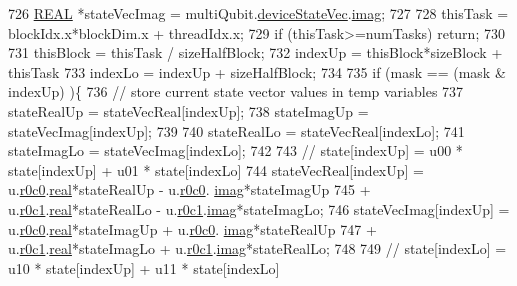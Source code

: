\begin{DoxyCode}
726     \mbox{\hyperlink{QuEST__precision_8h_a4b654506f18b8bfd61ad2a29a7e38c25}{REAL}} *stateVecImag = multiQubit.\mbox{\hyperlink{structMultiQubit_a59ac613486a41b8c9a4b6e79cc8d2cc3}{deviceStateVec}}.\mbox{\hyperlink{structComplexArray_a79dde47c7ae530c79cebfdf57b225968}{imag}};
727 
728     thisTask = blockIdx.x*blockDim.x + threadIdx.x;
729     \textcolor{keywordflow}{if} (thisTask>=numTasks) \textcolor{keywordflow}{return};
730 
731     thisBlock   = thisTask / sizeHalfBlock;
732     indexUp     = thisBlock*sizeBlock + thisTask%
733     indexLo     = indexUp + sizeHalfBlock;
734 
735     \textcolor{keywordflow}{if} (mask == (mask & indexUp) )\{
736         \textcolor{comment}{// store current state vector values in temp variables}
737         stateRealUp = stateVecReal[indexUp];
738         stateImagUp = stateVecImag[indexUp];
739 
740         stateRealLo = stateVecReal[indexLo];
741         stateImagLo = stateVecImag[indexLo];
742 
743         \textcolor{comment}{// state[indexUp] = u00 * state[indexUp] + u01 * state[indexLo]}
744         stateVecReal[indexUp] = u.\mbox{\hyperlink{structComplexMatrix2_ae72b4458233b077a636beee1892e81ff}{r0c0}}.\mbox{\hyperlink{structComplex_a479ad939835457595fcca3ca55c06283}{real}}*stateRealUp - u.\mbox{\hyperlink{structComplexMatrix2_ae72b4458233b077a636beee1892e81ff}{r0c0}}.
      \mbox{\hyperlink{structComplex_a1151948284b21c0052f203f23ab931d9}{imag}}*stateImagUp 
745             + u.\mbox{\hyperlink{structComplexMatrix2_a0f3932f055a8b05cef361bce25d51172}{r0c1}}.\mbox{\hyperlink{structComplex_a479ad939835457595fcca3ca55c06283}{real}}*stateRealLo - u.\mbox{\hyperlink{structComplexMatrix2_a0f3932f055a8b05cef361bce25d51172}{r0c1}}.\mbox{\hyperlink{structComplex_a1151948284b21c0052f203f23ab931d9}{imag}}*stateImagLo;
746         stateVecImag[indexUp] = u.\mbox{\hyperlink{structComplexMatrix2_ae72b4458233b077a636beee1892e81ff}{r0c0}}.\mbox{\hyperlink{structComplex_a479ad939835457595fcca3ca55c06283}{real}}*stateImagUp + u.\mbox{\hyperlink{structComplexMatrix2_ae72b4458233b077a636beee1892e81ff}{r0c0}}.
      \mbox{\hyperlink{structComplex_a1151948284b21c0052f203f23ab931d9}{imag}}*stateRealUp 
747             + u.\mbox{\hyperlink{structComplexMatrix2_a0f3932f055a8b05cef361bce25d51172}{r0c1}}.\mbox{\hyperlink{structComplex_a479ad939835457595fcca3ca55c06283}{real}}*stateImagLo + u.\mbox{\hyperlink{structComplexMatrix2_a0f3932f055a8b05cef361bce25d51172}{r0c1}}.\mbox{\hyperlink{structComplex_a1151948284b21c0052f203f23ab931d9}{imag}}*stateRealLo;
748 
749         \textcolor{comment}{// state[indexLo] = u10  * state[indexUp] + u11 * state[indexLo]}

\end{DoxyCode}
